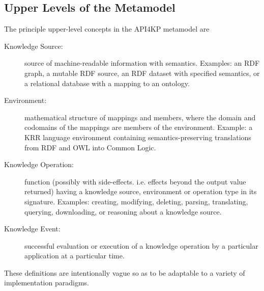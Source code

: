 \documentclass[runningheads]{llncs}
\begin{document}
\subsection{Upper Levels of the Metamodel}
\label{sec:upper}
The principle upper-level concepts in the API4KP metamodel are
\begin{description}
\item[Knowledge Source:] source of machine-readable information with semantics. Examples: an RDF graph, a mutable RDF source, an RDF dataset with specified semantics, or a relational database with a mapping to an ontology.
\item[Environment:] mathematical structure of mappings and members, where the domain and codomains of the mappings are members of the environment.  Example: a KRR language environment containing semantics-preserving translations from RDF and OWL into Common Logic.
\item[Knowledge Operation:] function (possibly with side-effects. i.e. effects beyond the output value returned) having a knowledge source, environment or operation type in its signature. Examples: creating, modifying, deleting, parsing, translating, querying, downloading, or reasoning about a knowledge source.
\item[Knowledge Event:] successful evaluation or execution of a knowledge operation by a particular application at a particular time.
\end{description}
These definitions are intentionally vague so as to be adaptable to a variety of implementation paradigms.
\end{document}
